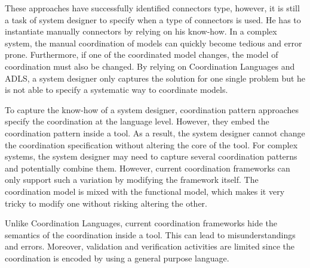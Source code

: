 These approaches have successfully identified connectors type, however, it is still a task of system designer to specify when a type of connectors is used. He has to instantiate manually connectors by relying on his know-how. In a complex system, the manual coordination of models can quickly become tedious and error prone. Furthermore, if one of the coordinated model changes, the model of coordination must also be changed. By relying on Coordination Languages and ADLS, a system designer only captures the solution for one single problem but he is not able to specify a systematic way to coordinate models. 

To capture the know-how of a system designer, coordination pattern approaches specify the coordination at the language level. However, they embed the coordination pattern inside a tool. As a result, the system designer cannot change the coordination specification without altering the core of the tool. For complex systems, the system designer may need to capture several coordination patterns and potentially combine them. However, current coordination frameworks can only support such a variation by modifying the framework itself. The coordination model is mixed with the functional model, which makes it very tricky to modify one without risking altering the other.

Unlike Coordination Languages, current coordination frameworks hide the semantics of the coordination inside a tool. This can lead to misunderstandings and errors. Moreover, validation and verification activities are limited since the coordination is encoded by using a general purpose language.


		



